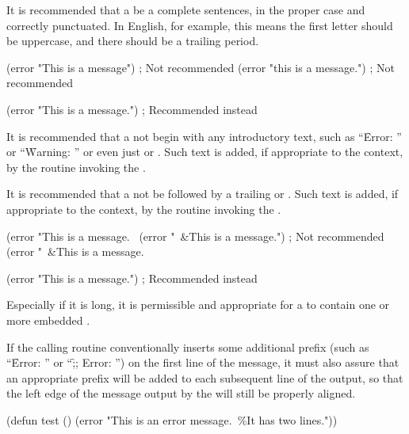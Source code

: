 
It is recommended that a  be a complete sentences, in the
proper case and correctly punctuated.  In English, for example, this
means the first letter should be uppercase, and there should be a
trailing period.

\code
 (error "This is a message")  ; Not recommended
 (error "this is a message.") ; Not recommended

 (error "This is a message.") ; Recommended instead
\endcode

\endsubsubsubsection%


It is recommended that a  not begin with any 
introductory text, such as ``\f{Error: }'' or ``\f{Warning: }''
or even just  or . 
Such text is added, if appropriate to the context,
by the routine invoking the .

It is recommended that a  not be followed 
by a trailing  or .
Such text is added, if appropriate to the context, 
by the routine invoking the .

\code
 (error "This is a message.~%
 (error "~&This is a message.")   ; Not recommended
 (error "~&This is a message.~%

 (error "This is a message.")     ; Recommended instead
\endcode

\endsubsubsubsection%


Especially if it is long, it is permissible and appropriate for 
a  to contain one or more embedded .

If the calling routine conventionally inserts some additional prefix
(such as ``\f{Error: }'' or ``\f{;; Error: }'') on the first line of
the message, it must also assure that an appropriate prefix will be
added to each subsequent line of the output, so that the left edge of
the message output by the  will still be properly
aligned.

\code
 (defun test ()
   (error "This is an error message.~\%It has two lines."))

